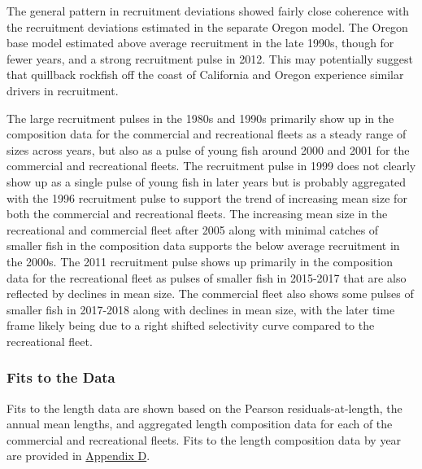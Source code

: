 \documentclass[11pt,
  english,
  letterpaper,
]{article}
\begin{document}

The general pattern in recruitment deviations showed fairly close coherence with the recruitment deviations estimated in the separate Oregon model. The Oregon base model estimated above average recruitment in the late 1990s, though for fewer years, and a strong recruitment pulse in 2012. This may potentially suggest that quillback rockfish off the coast of California and Oregon experience similar drivers in recruitment.

\leavevmode\tagmcend\tagstructend\par


The large recruitment pulses in the 1980s and 1990s primarily show up in the composition data for the commercial and recreational fleets as a steady range of sizes across years, but also as a pulse of young fish around 2000 and 2001 for the commercial and recreational fleets. The recruitment pulse in 1999 does not clearly show up as a single pulse of young fish in later years but is probably aggregated with the 1996 recruitment pulse to support the trend of increasing mean size for both the commercial and recreational fleets. The increasing mean size in the recreational and commercial fleet after 2005 along with minimal catches of smaller fish in the composition data supports the below average recruitment in the 2000s. The 2011 recruitment pulse shows up primarily in the composition data for the recreational fleet as pulses of smaller fish in 2015-2017 that are also reflected by declines in mean size. The commercial fleet also shows some pulses of smaller fish in 2017-2018 along with declines in mean size, with the later time frame likely being due to a right shifted selectivity curve compared to the recreational fleet.

\leavevmode\tagmcend\tagstructend\par


\hypertarget{fits-to-the-data}{%
\subsubsection{Fits to the Data}\label{fits-to-the-data}}

\leavevmode\tagmcend\tagstructend


Fits to the length data are shown based on the Pearson residuals-at-length, the annual mean lengths, and aggregated length composition data for each of the commercial and recreational fleets. Fits to the length composition data by year are provided in {\protect\hyperlink{append_d}{Appendix D}\leavevmode\tagmcend\tagstructend}.
\end{document}
